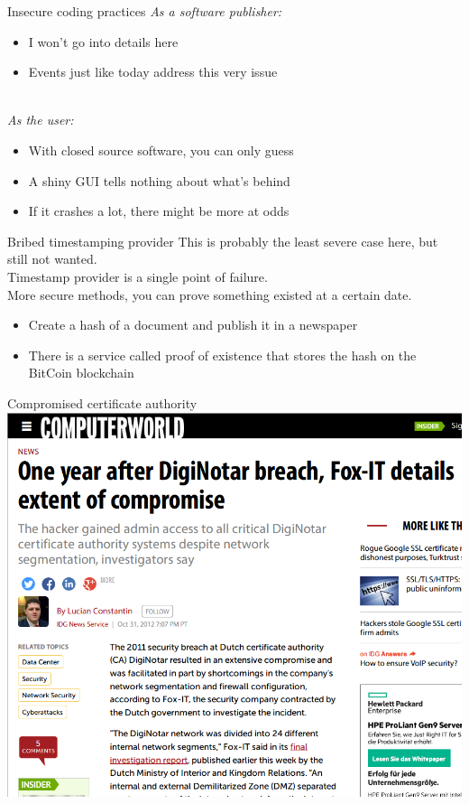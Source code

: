\documentclass[11pt]{beamer}
\begin{document}
\begin{frame}{Insecure coding practices}
\emph{As a software publisher:}
\begin{itemize}
\item I won't go into details here
\item Events just like today address this very issue
\end{itemize}
\\[0.2cm]
\pause
\emph{As the user:}
\begin{itemize}
\item With closed source software, you can only guess
\item A shiny GUI tells nothing about what's behind
\item If it crashes a lot, there might be more at odds
\end{itemize}
\end{frame}

\begin{frame}{Bribed timestamping provider}
This is probably the least severe case here, but still not wanted.
\\[0.2cm]
Timestamp provider is a single point of failure.
\\[0.2cm]
More secure methods, you can prove something existed at a certain date.
\\[0.2cm]
\pause
\begin{itemize}
\item Create a hash of a document and publish it in a newspaper
\pause
\item There is a service called proof of existence that stores the hash on the BitCoin blockchain
\end{itemize}
\end{frame}

\begin{frame}{Compromised certificate authority}
\includegraphics[scale=0.28]{diginotar.png}
\end{frame}
\end{document}
